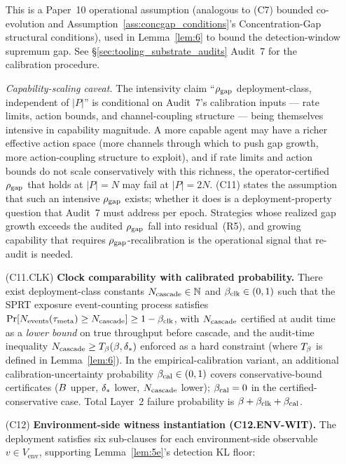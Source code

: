 \begin{theorem}
\begin{enumerate}
  This is a Paper~10 operational assumption (analogous to (C7)
  bounded co-evolution and Assumption~\ref{ass:concgap_conditions}'s
  Concentration-Gap structural conditions), used in
  Lemma~\ref{lem:6} to bound the detection-window supremum gap.
  See \S\ref{sec:tooling_substrate_audits} Audit~7 for the
  calibration procedure.

  \emph{Capability-scaling caveat.}  The intensivity claim ``$\rhogap$
  deployment-class, independent of $|P|$'' is conditional on Audit~7's
  calibration inputs --- rate limits, action bounds, and channel-coupling
  structure --- being themselves intensive in capability magnitude.  A more
  capable agent may have a richer effective action space (more channels through
  which to push gap growth, more action-coupling structure to exploit), and if
  rate limits and action bounds do not scale conservatively with this richness,
  the operator-certified $\rhogap$ that holds at $|P| = N$ may fail at $|P| =
  2N$.  (C11) states the assumption that such an intensive $\rhogap$ exists;
  whether it does is a deployment-property question that Audit~7 must address
  per epoch.  Strategies whose realized gap growth exceeds the audited
  $\rhogap$ fall into residual~(R5), and growing capability that requires
  $\rhogap$-recalibration is the operational signal that re-audit is needed.
\item[(C11.CLK)] \textbf{Clock comparability with calibrated
  probability.}  There exist deployment-class constants
  $N_{\mathrm{cascade}} \in \mathbb{N}$ and $\beta_{\mathrm{clk}} \in (0,1)$ such that the SPRT
  exposure event-counting process satisfies
  $\Pr[N_{\mathrm{events}}(\tau_{\mathrm{meta}}) \geq N_{\mathrm{cascade}}] \geq 1 - \beta_{\mathrm{clk}}$,
  with $N_{\mathrm{cascade}}$ certified at audit time as a \emph{lower bound} on
  true throughput before cascade, and the audit-time inequality
  $N_{\mathrm{cascade}} \geq T_{\beta}(\beta, \delta_{*})$ enforced as a hard
  constraint (where $T_{\beta}$ is defined in Lemma~\ref{lem:6}).
  In the empirical-calibration variant, an additional
  calibration-uncertainty probability $\beta_{\mathrm{cal}} \in (0,1)$ covers
  conservative-bound certificates ($B$ upper, $\delta_{*}$
  lower, $N_{\mathrm{cascade}}$ lower); $\beta_{\mathrm{cal}} = 0$ in the certified-conservative
  case.  Total Layer~2 failure probability is $\beta + \beta_{\mathrm{clk}} +
  \beta_{\mathrm{cal}}$.
\item[(C12)] \textbf{Environment-side witness instantiation
  (C12.ENV-WIT).}  The deployment satisfies six sub-clauses for
  each environment-side observable $v \in V_{\mathrm{env}}$,
  supporting Lemma~\ref{lem:5e}'s detection KL floor:
  \begin{itemize}

\end{itemize}
\end{enumerate}
\end{theorem}
